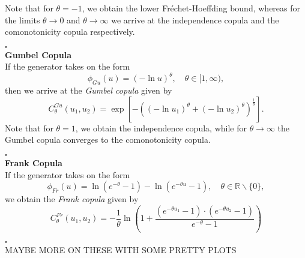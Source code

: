 Note that for $\theta=-1$, we obtain the lower Fr\'echet-Hoeffding bound, whereas for the limits $\theta \rightarrow 0$ and $\theta \rightarrow \infty$ we arrive at the independence copula and the comonotonicity copula respectively.

\hfill $\square$ \\

\textbf{Gumbel Copula}\\
If the generator takes on the form
\begin{equation}
\phi_{G u}(u)=(-\ln u)^{\theta}, \quad \theta \in [1, \infty),
\end{equation}
then we arrive at the \textit{Gumbel copula} given by
\begin{equation}
C_{\theta}^{G u}\left(u_{1}, u_{2}\right)=\exp \left[-\left(\left(-\ln u_{1}\right)^{\theta}+\left(-\ln u_{2}\right)^{\theta}\right)^{\frac{1}{\theta}}\right].
\end{equation}
Note that for $\theta= 1$, we obtain the independence copula, while for $\theta \rightarrow \infty$ the Gumbel copula converges to the comonotonicity copula.

\hfill $\square$ \\


\textbf{Frank Copula}\\
If the generator takes on the form
\begin{equation}
\phi_{Fr}(u) = \ln \left(e^{-\theta}-1\right)-\ln \left(e^{-\theta u}-1\right), \quad \theta \in \mathbb{R} \backslash\{0\},
\end{equation}
we obtain the \textit{Frank copula} given by
\begin{equation}
C_{\theta}^{F r}\left(u_{1}, u_{2}\right)=-\frac{1}{\theta} \ln \left(1+\frac{\left(e^{-\theta u_{1}}-1\right) \cdot\left(e^{-\theta u_{2}}-1\right)}{e^{-\theta}-1}\right)
\end{equation}

\hfill $\square$ \\


MAYBE MORE ON THESE WITH SOME PRETTY PLOTS





